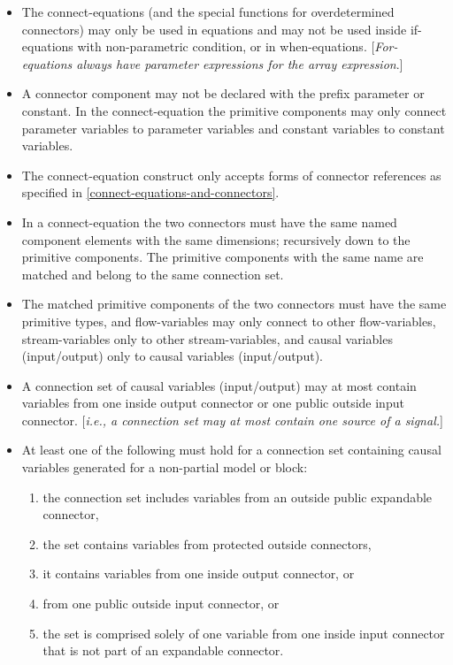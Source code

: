 \begin{itemize}
\item
  The connect-equations (and the special functions for overdetermined
  connectors) may only be used in equations and may not be used inside
  if-equations with non-parametric condition, or in when-equations.
  {[}\emph{For-equations always have parameter expressions for the array
  expression}.{]}
\item
  A connector component may not be declared with the prefix parameter or
  constant. In the connect-equation the primitive components may only
  connect parameter variables to parameter variables and constant
  variables to constant variables.
\item
  The connect-equation construct only accepts forms of connector
  references as specified in \ref{connect-equations-and-connectors}.
\item
  In a connect-equation the two connectors must have the same named
  component elements with the same dimensions; recursively down to the
  primitive components. The primitive components with the same name are
  matched and belong to the same connection set.
\item
  The matched primitive components of the two connectors must have the
  same primitive types, and flow-variables may only connect to other
  flow-variables, stream-variables only to other stream-variables, and
  causal variables (input/output) only to causal variables
  (input/output).
\item
  A connection set of causal variables (input/output) may at most
  contain variables from one inside output connector or one public
  outside input connector. {[}\emph{i.e., a connection set may at most
  contain one source of a signal.}{]}
\item
  At least one of the following must hold for a connection set
  containing causal variables generated for a non-partial model or
  block:
\begin{enumerate}
\item the connection set includes variables from an outside public
  expandable connector,
\item the set contains variables from protected
  outside connectors,
\item it contains variables from one inside output
  connector, or
\item from one public outside input connector, or
\item the  set is comprised solely of one variable from one inside input
  connector that is not part of an expandable connector. \label{enum:exc-conn-case}

\end{enumerate}
\end{itemize}

